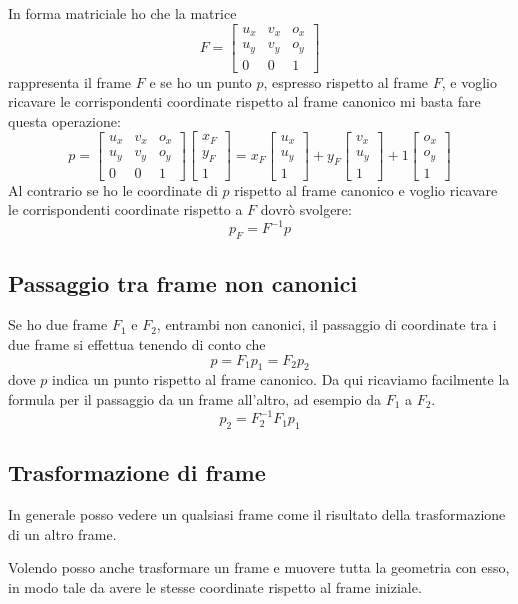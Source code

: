 In forma matriciale ho che la matrice
\[
	F = \begin{bmatrix}
		u_x & v_x & o_x \\
		u_y & v_y & o_y \\
		0   & 0   & 1
	\end{bmatrix}
\]
rappresenta il frame $F$ e se ho un punto $p$, espresso rispetto al frame $F$, e voglio
ricavare le corrispondenti coordinate rispetto al frame canonico mi basta fare questa
operazione:
\[
	p = \begin{bmatrix}
		u_x & v_x & o_x \\
		u_y & v_y & o_y \\
		0   & 0   & 1
	\end{bmatrix}
	\begin{bmatrix}
		x_F \\ y_F \\ 1
	\end{bmatrix} =
	x_F \begin{bmatrix}
		u_x \\ u_y \\ 1
	\end{bmatrix} +
	y_F \begin{bmatrix}
		v_x \\ u_y \\ 1
	\end{bmatrix} +
	1 \begin{bmatrix}
		o_x \\ o_y \\ 1
	\end{bmatrix}
\]
Al contrario se ho le coordinate di $p$ rispetto al frame canonico e voglio ricavare le
corrispondenti coordinate rispetto a $F$ dovr\`o svolgere:
\[ p_F = F^{-1} p \]

\subsection{Passaggio tra frame non canonici}
Se ho due frame $F_1$ e $F_2$, entrambi non canonici, il passaggio di coordinate tra i due frame
si effettua tenendo di conto che
\[ p = F_1 p_1 = F_2 p_2 \]
dove $p$ indica un punto rispetto al frame canonico. Da qui ricaviamo facilmente la formula
per il passaggio da un frame all'altro, ad esempio da $F_1$ a $F_2$.
\[ p_2 = F_2^{-1} F_1 p_1 \]

\subsection{Trasformazione di frame}
In generale posso vedere un qualsiasi frame come il risultato della trasformazione di un altro
frame.

Volendo posso anche trasformare un frame e muovere tutta la geometria con esso, in modo tale
da avere le stesse coordinate rispetto al frame iniziale.